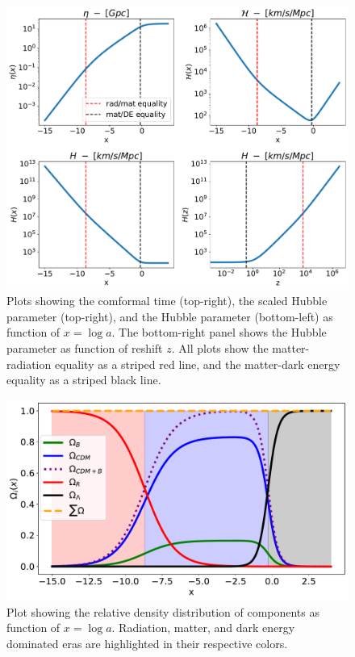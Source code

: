 \documentclass[10pt, a4paper]{article}
\begin{document}
\begin{figure}[H]
    \centering
    \includegraphics[scale=0.5]{../m1_figs/H.pdf}
    \caption{Plots showing the comformal time (top-right), the scaled Hubble parameter (top-right), and the Hubble parameter (bottom-left) as function of $x=\log{a}$. The bottom-right panel shows the Hubble parameter as function of reshift $z$. All plots show the matter-radiation equality as a striped red line, and the matter-dark energy equality as a striped black line.}
    \label{fig:Omegas}
\end{figure}


\begin{figure}[H]
    \centering
    \includegraphics[scale=0.5]{../m1_figs/Omegas.pdf}
    \caption{Plot showing the relative density distribution of components as function of $x=\log{a}$. Radiation, matter, and dark energy dominated eras are highlighted in their respective colors.}
    \label{fig:H}
\end{figure}
\end{document}
